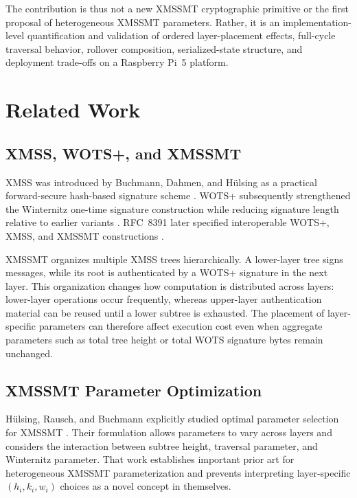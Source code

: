 \documentclass[pdflatex,sn-mathphys-num]{sn-jnl}
\begin{document}
The contribution is thus not a new XMSSMT cryptographic primitive or the
first proposal of heterogeneous XMSSMT parameters. Rather, it is an
implementation-level quantification and validation of ordered
layer-placement effects, full-cycle traversal behavior, rollover
composition, serialized-state structure, and deployment trade-offs on
a Raspberry Pi~5 platform.


\section{Related Work}
\label{sec:related_work}

\subsection{XMSS, WOTS+, and XMSSMT}
\label{sec:related_xmss}

XMSS was introduced by Buchmann, Dahmen, and H{\"u}lsing as a practical
forward-secure hash-based signature scheme
\cite{Buchmann2011XMSS}. WOTS+ subsequently strengthened the
Winternitz one-time signature construction while reducing signature
length relative to earlier variants \cite{Huelsing2013WOTSPlus}.
RFC~8391 later specified interoperable WOTS+, XMSS, and XMSSMT
constructions \cite{RFC8391}.

XMSSMT organizes multiple XMSS trees hierarchically. A lower-layer tree
signs messages, while its root is authenticated by a WOTS+ signature in
the next layer. This organization changes how computation is distributed
across layers: lower-layer operations occur frequently, whereas
upper-layer authentication material can be reused until a lower subtree
is exhausted. The placement of layer-specific parameters can therefore
affect execution cost even when aggregate parameters such as total tree
height or total WOTS signature bytes remain unchanged.

\subsection{XMSSMT Parameter Optimization}
\label{sec:related_optimization}

H{\"u}lsing, Rausch, and Buchmann explicitly studied optimal parameter
selection for XMSSMT \cite{OptimalParametersXMSSMT}. Their formulation
allows parameters to vary across layers and considers the interaction
between subtree height, traversal parameter, and Winternitz parameter.
That work establishes important prior art for heterogeneous XMSSMT
parameterization and prevents interpreting layer-specific
$(h_i,k_i,w_i)$ choices as a novel concept in themselves.
\end{document}
